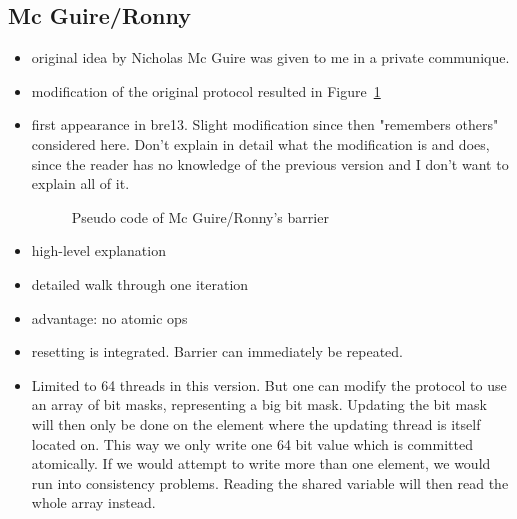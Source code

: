 \documentclass[a4paper, 10pt]{article}
\begin{document}
\begin{enumerate}
\subsection{Mc Guire/Ronny}
\label{ssec:new-nmg}
\begin{itemize}
	\item original idea by Nicholas Mc Guire was given to me in a private communique.
	\item modification of the original protocol resulted in Figure~\ref{fig:nmg-ronny-with-reset}
	\item first appearance in bre13\cite{bre13}. Slight modification since then "remembers others" considered here. Don't explain in detail what the modification is and does, since the reader has no knowledge of the previous version and I don't want to explain all of it.
		\begin{figure}[htbp]
			\centering
			
			\caption{Pseudo code of Mc Guire/Ronny's barrier}
			\label{fig:nmg-ronny-with-reset}
		\end{figure}
	\item high-level explanation
	\item detailed walk through one iteration
	\item advantage: no atomic ops
	\item resetting is integrated. Barrier can immediately be repeated.
	\item Limited to 64 threads in this version. But one can modify the protocol to use an array of bit masks, representing a big bit mask. Updating the bit mask will then only be done on the element where the updating thread is itself located on. This way we only write one 64 bit value which is committed atomically. If we would attempt to write more than one element, we would run into consistency problems. Reading the shared variable will then read the whole array instead.
\end{itemize}


\end{enumerate}
\end{document}

